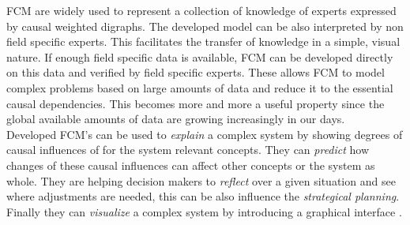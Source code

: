 \documentclass[conference]{IEEEtran}
\begin{document}
FCM are widely used to represent a collection of knowledge of experts expressed by causal weighted digraphs. The developed model can be also interpreted by non field specific experts. This facilitates the transfer of knowledge in a simple, visual nature. If enough field specific data is available, FCM can be developed directly on this data and verified by field specific experts. These allows FCM to model complex problems based on large amounts of data and reduce it to the essential causal dependencies. This becomes more and more a useful property since the global available amounts of data are growing increasingly in our days.\\
Developed FCM's can be used to \emph{explain} a complex system by showing degrees of causal influences of for the system relevant concepts. They can \emph{predict} how changes of these causal influences can affect other concepts or the system as whole. They are helping decision makers to \emph{reflect} over a given situation and see where adjustments are needed, this can be also influence the \emph{strategical planning}. Finally they can \emph{visualize} a complex system by introducing a graphical interface \cite{papageorgiou2013}.
\end{document}
